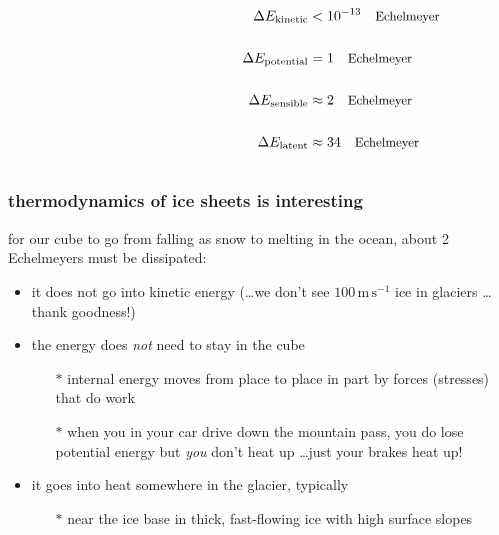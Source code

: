 \documentclass{beamer}
\begin{document}
\begin{frame}
\begin{columns}
\begin{column}{0.2\textwidth}
\begin{center}
  \end{center}
\end{column}
\begin{column}{0.85\textwidth}
\newcommand{\echel}{\text{\small Echelmeyer}}
\begin{align*}
  \Delta E_{\text{kinetic}} &< 10^{-13} \quad\echel \\
  &\phantom{=} \\
  \Delta E_{\text{potential}} &= 1 \quad\echel \\
  &\phantom{=} \\
  \Delta E_{\text{sensible}} &\approx 2 \quad\echel \\
  &\phantom{=} \\
  \Delta E_{\text{latent}} &\approx 34 \quad\echel
\end{align*}
\end{column}
\end{columns}
\end{frame}


\begin{frame}
  \frametitle{thermodynamics of ice sheets is interesting}

for our cube to go from falling as snow to melting in the ocean, about 2 Echelmeyers must be dissipated:
\begin{itemize}
\small
\item it does not go into kinetic energy (\dots we don't see $100\,\text{m}\,\text{s}^{-1}$ ice in glaciers \dots thank goodness!)
\item the energy does \emph{not} need to stay in the cube
  \begin{itemize}
  \item[$\ast$] internal energy moves from place to place in part by forces (stresses) that do work
  \item[$\ast$] when you in your car drive down the mountain pass, you do lose potential energy but \emph{you} don't heat up \dots just your brakes heat up!
  \end{itemize}
\item it goes into heat somewhere in the glacier, typically
  \begin{itemize}
  \item[$\ast$] near the ice base in thick, fast-flowing ice with high surface slopes
  \end{itemize}
\end{itemize}
\end{frame}
\end{document}
